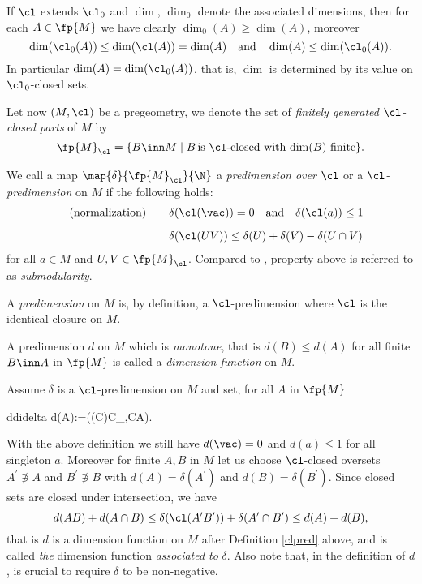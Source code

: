 If $\cl$ extends $\cl_{0}$ and $\dim$, $\dim_{0}$ denote the associated dimensions, then for each
$A\in\fp{M}$ we have clearly $\dim_{0}(A)\geq\dim(A)$, moreover
$$
\dim(\cl_{0}(A))\leq\dim(\cl(A))=\dim(A)\quad\text{and}\quad\dim(A)\leq\dim(\cl_{0}(A)).
$$
In particular $\dim(A)=\dim(\cl_{0}(A))$, that is, $\dim$ is determined by its value on $\cl_{0}$-closed sets.

\smallskip
Let now $(M,\cl)$ be a pregeometry, %
we denote the set of \emph{finitely generated $\cl$-closed parts} of $M$ by
$${\fp{M}}_{\cl}=\{B\inn M\mid B\,\text{is $\cl$-closed with $\dim(B)$ finite}\}.$$
\begin{dfn}\label{clpred}
We call a map $\map{\delta}{\fp{M}_{\cl}}{\N}$ a {\em predimension over $\cl$} or a \emph{$\cl$-predimension}
on $M$ if the following holds:
\begin{align}
\tag{normalization}\qquad&\delta(\cl(\vac))=0\quad\text{and}\quad\delta(\cl(a))\leq1&\\[+2mm]
\qquad&\delta(\cl(UV))\leq\delta(U)+\delta(V)-\delta(U\cap V)&\label{summo}
\end{align}
for all $a\in M$ and $U,V\in\fp{M}_{\cl}$. Compared to , property  above is referred to as
{\em submodularity}.

A {\em predimension} on $M$ is, by definition, a $\cl$-predimension where $\cl$
is the identical closure on $M$.%

A predimension $d$ on $M$ which is {\em monotone}, that is $d(B)\leq d(A)$ for all finite $B\inn A$ in $\fp{M}$
is called a {\em dimension function} on $M$.
\end{dfn}

\medskip
Assume $\delta$ is a $\cl$-predimension on $M$ and set, for all $A$ in $\fp{M}$
\begin{labeq}{ddidelta}
d(A):=\min(\delta(C)\mid C\in{}_{\cl},\:C\nni A).
\end{labeq}
With the above definition we still have $d(\vac)=0$ and $d(a)\leq1$ for all singleton $a$.
Moreover for finite  $A,B$ in $M$ let us choose $\cl$-closed oversets $A^{\prime}\nni A$ and $B^{\prime}\nni B$
with $d(A)=\delta(A^{\prime})$ and $d(B)=\delta(B^{\prime})$.
Since closed sets are closed under intersection, we have
$$d(AB)+d(A\cap B)\leq\delta(\cl(A^{\prime}B^{\prime}))+\delta(A^{\prime}\cap B^{\prime})\leq d(A)+d(B),$$
that is $d$ is a dimension function on $M$ after Definition \ref{clpred} above, and
is called {\em the} dimension function {\em associated to} $\delta$.
Also note that, in the definition of $d$, is crucial to require $\delta$ to be non-negative.

